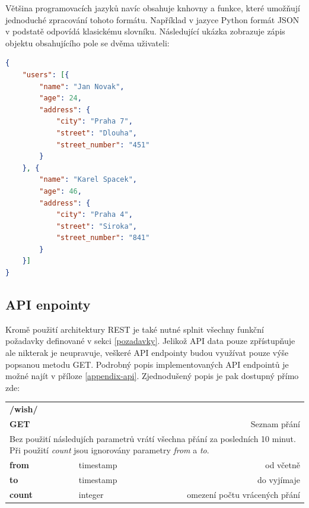 \documentclass[thesis=B,czech]{FITthesis}[2012/06/26]
\begin{document}
	Většina programovacích jazyků navíc obsahuje knhovny a funkce, které umožňují jednoduché zpracování tohoto formátu. Například v jazyce Python formát JSON v podstatě odpovídá klasickému slovníku. Následující ukázka zobrazuje zápis objektu obsahujícího pole se dvěma uživateli:
\begin{lstlisting}[language=json,firstnumber=1]
{
	"users": [{
		"name": "Jan Novak",
		"age": 24,
		"address": {
			"city": "Praha 7",
			"street": "Dlouha",
			"street_number": "451"
		}
	}, {
		"name": "Karel Spacek",
		"age": 46,
		"address": {
			"city": "Praha 4",
			"street": "Siroka",
			"street_number": "841"
		}
	}]
}
\end{lstlisting}
	
\subsection{API enpointy}
	Kromě použití architektury REST je také nutné splnit všechny funkční požadavky definované v sekci \ref{pozadavky}. Jelikož API data pouze zpřístupňuje ale nikterak je neupravuje, veškeré API endpointy budou využívat pouze výše popsanou metodu GET. Podrobný popis implementovaných API endpointů je možné najít v příloze \ref{appendix-api}. Zjednodušený popis je pak dostupný přímo zde: 
	

\begin{table}[h]
\begin{tabular}{llllr}
\rowcolor[HTML]{EFEFEF}
\large \textbf{/wish/}        &         &                 &        & \multicolumn{1}{l}{}                \\
\rowcolor[HTML]{EFEFEF}
\textbf{GET}          &         &                 &        & Seznam přání                        \\
\multicolumn{5}{l}{\parbox[t]{12.8cm}{Bez použití následujích parametrů vrátí všechna přání za posledních 10 minut. Při použití \textit{count} jsou ignorovány parametry  \textit{from} a \textit{to}.}  } \\
\textbf{from}         &         & timestamp       &        & od včetně                           \\
\textbf{to}           &         & timestamp       &        & do vyjímaje                         \\
\textbf{count}        &         & integer         &        & omezení počtu vrácených přání      \\
\end{tabular}
\end{table}
\end{document}
